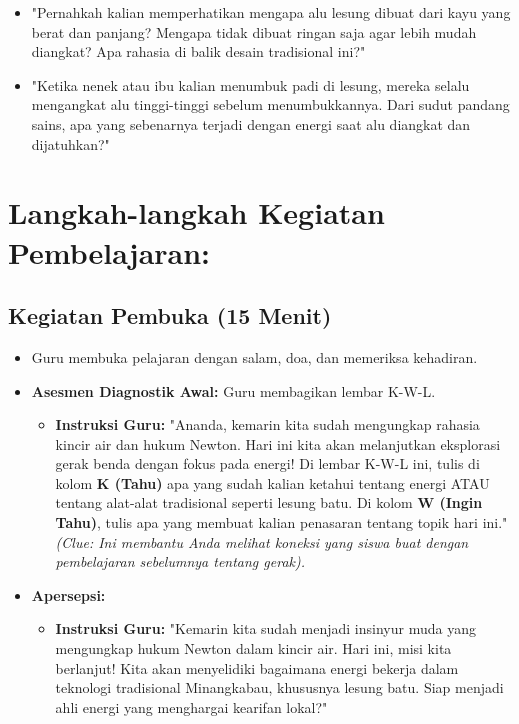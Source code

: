 \documentclass[a4paper,12pt]{article}
\begin{document}
\begin{itemize}
\item "Pernahkah kalian memperhatikan mengapa alu lesung dibuat dari kayu yang berat dan panjang? Mengapa tidak dibuat ringan saja agar lebih mudah diangkat? Apa rahasia di balik desain tradisional ini?"
\item "Ketika nenek atau ibu kalian menumbuk padi di lesung, mereka selalu mengangkat alu tinggi-tinggi sebelum menumbukkannya. Dari sudut pandang sains, apa yang sebenarnya terjadi dengan energi saat alu diangkat dan dijatuhkan?"
\end{itemize}

\section{Langkah-langkah Kegiatan Pembelajaran:}

\subsection{Kegiatan Pembuka (15 Menit)}
\begin{itemize}
\item Guru membuka pelajaran dengan salam, doa, dan memeriksa kehadiran.
\item \textbf{Asesmen Diagnostik Awal:} Guru membagikan lembar K-W-L.
    \begin{itemize}
    \item \textbf{Instruksi Guru:} "Ananda, kemarin kita sudah mengungkap rahasia kincir air dan hukum Newton. Hari ini kita akan melanjutkan eksplorasi gerak benda dengan fokus pada energi! Di lembar K-W-L ini, tulis di kolom \textbf{K (Tahu)} apa yang sudah kalian ketahui tentang energi ATAU tentang alat-alat tradisional seperti lesung batu. Di kolom \textbf{W (Ingin Tahu)}, tulis apa yang membuat kalian penasaran tentang topik hari ini." \textit{(Clue: Ini membantu Anda melihat koneksi yang siswa buat dengan pembelajaran sebelumnya tentang gerak).}
    \end{itemize}
\item \textbf{Apersepsi:}
    \begin{itemize}
    \item \textbf{Instruksi Guru:} "Kemarin kita sudah menjadi insinyur muda yang mengungkap hukum Newton dalam kincir air. Hari ini, misi kita berlanjut! Kita akan menyelidiki bagaimana energi bekerja dalam teknologi tradisional Minangkabau, khususnya lesung batu. Siap menjadi ahli energi yang menghargai kearifan lokal?"
    \end{itemize}
\end{itemize}
\end{document}
